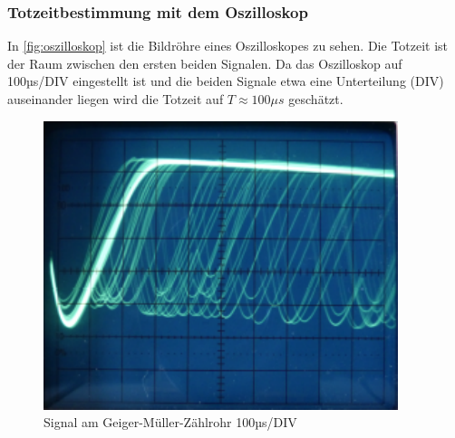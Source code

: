 \subsubsection{Totzeitbestimmung mit dem Oszilloskop}
\label{sec:totzeitO}
In \autoref{fig:oszilloskop} ist die Bildröhre eines Oszilloskopes zu sehen. Die Totzeit ist der Raum 
zwischen den ersten beiden Signalen. Da das Oszilloskop auf 100µs/DIV eingestellt ist und die beiden Signale 
etwa eine Unterteilung (DIV) auseinander liegen wird die Totzeit auf $T \approx 100\mu s$ geschätzt.
\begin{figure}
  \centering
  \includegraphics{oszilloskop.pdf}
  \caption{Signal am Geiger-Müller-Zählrohr 100µs/DIV}
  \label{fig:oszilloskop}
\end{figure}
